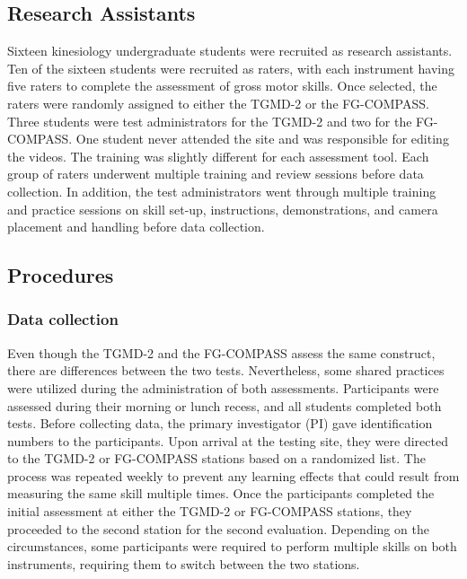 \documentclass[
  man,
  colorlinks=true,linkcolor=blue,citecolor=blue,urlcolor=blue]{apa7}
\begin{document}
\hypertarget{research-assistants}{%
\subsection{Research Assistants}\label{research-assistants}}

Sixteen kinesiology undergraduate students were recruited as research
assistants. Ten of the sixteen students were recruited as raters, with
each instrument having five raters to complete the assessment of gross
motor skills. Once selected, the raters were randomly assigned to either
the TGMD-2 or the FG-COMPASS. Three students were test administrators
for the TGMD-2 and two for the FG-COMPASS. One student never attended
the site and was responsible for editing the videos. The training was
slightly different for each assessment tool. Each group of raters
underwent multiple training and review sessions before data collection.
In addition, the test administrators went through multiple training and
practice sessions on skill set-up, instructions, demonstrations, and
camera placement and handling before data collection.

\hypertarget{procedures}{%
\subsection{Procedures}\label{procedures}}

\hypertarget{data-collection}{%
\subsubsection{Data collection}\label{data-collection}}

Even though the TGMD-2 and the FG-COMPASS assess the same construct,
there are differences between the two tests. Nevertheless, some shared
practices were utilized during the administration of both assessments.
Participants were assessed during their morning or lunch recess, and all
students completed both tests. Before collecting data, the primary
investigator (PI) gave identification numbers to the participants. Upon
arrival at the testing site, they were directed to the TGMD-2 or
FG-COMPASS stations based on a randomized list. The process was repeated
weekly to prevent any learning effects that could result from measuring
the same skill multiple times. Once the participants completed the
initial assessment at either the TGMD-2 or FG-COMPASS stations, they
proceeded to the second station for the second evaluation. Depending on
the circumstances, some participants were required to perform multiple
skills on both instruments, requiring them to switch between the two
stations.
\end{document}
